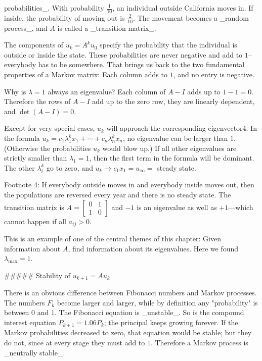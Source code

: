probabilities_. With probability \(\frac{1}{10}\), an individual outside California moves in. If inside, the probability of moving out is \(\frac{2}{10}\). The movement becomes a _random process_, and \(A\) is called a _transition matrix_.

The components of \(u_{k}=A^{k}u_{0}\) specify the probability that the individual is outside or inside the state. These probabilities are never negative and add to \(1\)--everybody has to be somewhere. That brings us back to the two fundamental properties of a Markov matrix: Each column adds to \(1\), and no entry is negative.

Why is \(\lambda=1\) always an eigenvalue? Each column of \(A-I\) adds up to \(1-1=0\). Therefore the rows of \(A-I\) add up to the zero row, they are linearly dependent, and \(\det(A-I)=0\).

Except for very special cases, \(u_{k}\) will approach the corresponding eigenvector4. In the formula \(u_{k}=c_{1}\lambda_{1}^{k}x_{1}+\cdots+c_{n}\lambda_{n}^{k}x_{n}\), no eigenvalue can be larger than \(1\). (Otherwise the probabilities \(u_{k}\) would blow up.) If all other eigenvalues are strictly smaller than \(\lambda_{1}=1\), then the first term in the formula will be dominant. The other \(\lambda_{i}^{k}\) go to zero, and \(u_{k}\to c_{1}x_{1}=u_{\infty}=\) steady state.

Footnote 4: If everybody outside moves in and everybody inside moves out, then the populations are reversed every year and there is no steady state. The transition matrix is \(A=\left[\begin{smallmatrix}0&1\\ 1&0\end{smallmatrix}\right]\) and \(-1\) is an eigenvalue as well as \(+1\)—which cannot happen if all \(a_{ij}>0\).

This is an example of one of the central themes of this chapter: Given information about \(A\), find information about its eigenvalues. Here we found \(\lambda_{\max}=1\).

##### Stability of \(u_{k+1}=Au_{k}\)

There is an obvious difference between Fibonacci numbers and Markov processes. The numbers \(F_{k}\) become larger and larger, while by definition any "probability" is between \(0\) and \(1\). The Fibonacci equation is _unstable_. So is the compound interest equation \(P_{k+1}=1.06P_{k}\); the principal keeps growing forever. If the Markov probabilities decreased to zero, that equation would be stable; but they do not, since at every stage they must add to \(1\). Therefore a Markov process is _neutrally stable_.

